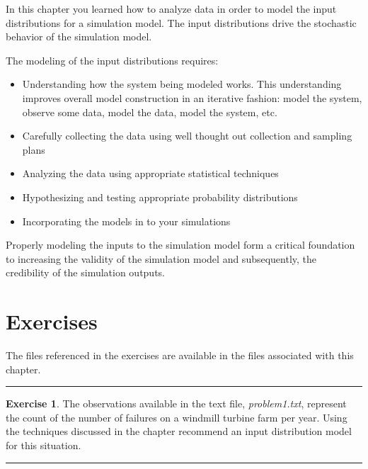 \documentclass[
]{book}
\theoremstyle{definition}
\theoremstyle{definition}
\theoremstyle{definition}
\newtheorem{exercise}{Exercise}[chapter]
\theoremstyle{definition}
\theoremstyle{remark}
\begin{document}
In this chapter you learned how to analyze data in order to model the
input distributions for a simulation model. The input distributions
drive the stochastic behavior of the simulation model.

The modeling of the input distributions requires:

\begin{itemize}
\item
  Understanding how the system being modeled works. This understanding
  improves overall model construction in an iterative fashion: model
  the system, observe some data, model the data, model the system,
  etc.
\item
  Carefully collecting the data using well thought out collection and
  sampling plans
\item
  Analyzing the data using appropriate statistical techniques
\item
  Hypothesizing and testing appropriate probability distributions
\item
  Incorporating the models in to your simulations
\end{itemize}

Properly modeling the inputs to the simulation model form a critical
foundation to increasing the validity of the simulation model and
subsequently, the credibility of the simulation outputs.

\hypertarget{exercises-2}{%
\section{Exercises}\label{exercises-2}}

The files referenced in the exercises are available in the files associated with this chapter.

\begin{center}\rule{0.5\linewidth}{0.5pt}\end{center}

\begin{exercise}
\protect\hypertarget{exr:AppDistFitP1}{}{\label{exr:AppDistFitP1} }The observations available in the text
file, \emph{problem1.txt}, represent the count of the number of failures
on a windmill turbine farm per year. Using the techniques discussed in
the chapter recommend an input distribution model for this situation.
\end{exercise}

\begin{center}\rule{0.5\linewidth}{0.5pt}\end{center}
\end{document}
